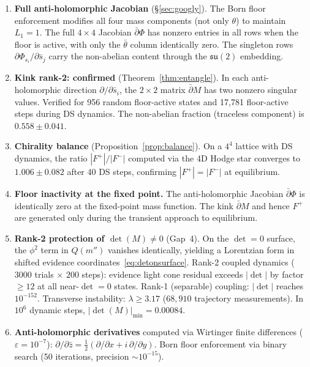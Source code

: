 \documentclass[11pt,a4paper]{article}
\theoremstyle{definition}
\theoremstyle{remark}
\newcommand{\dbar}{\bar{\partial}}
\newcommand{\su}{\mathfrak{su}}
\begin{document}
\begin{enumerate}[nosep]
\item \textbf{Full anti-holomorphic Jacobian} (\S\ref{sec:googly}). The Born floor enforcement modifies all four mass components (not only $\theta$) to maintain $L_1=1$. The full $4\times 4$ Jacobian $\dbar\Phi$ has nonzero entries in all rows when the floor is active, with only the $\bar{\theta}$ column identically zero. The singleton rows $\partial\Phi_{s_i}/\partial\bar{s}_j$ carry the non-abelian content through the $\su(2)$ embedding.

\item \textbf{Kink rank-2: confirmed} (Theorem~\ref{thm:entangle}). In each anti-holomorphic direction $\partial/\partial\bar{s}_i$, the $2\times 2$ matrix $\dbar M$ has two nonzero singular values. Verified for 956 random floor-active states and 17,781 floor-active steps during DS dynamics. The non-abelian fraction (traceless component) is $0.558\pm 0.041$.

\item \textbf{Chirality balance} (Proposition~\ref{prop:balance}). On a $4^4$ lattice with DS dynamics, the ratio $|F^+|/|F^-|$ computed via the 4D Hodge star converges to $1.006\pm 0.082$ after 40 DS steps, confirming $|F^+|=|F^-|$ at equilibrium.

\item \textbf{Floor inactivity at the fixed point.} The anti-holomorphic Jacobian $\dbar\Phi$ is identically zero at the fixed-point mass function. The kink $\dbar M$ and hence $F^+$ are generated only during the transient approach to equilibrium.

\item \textbf{Rank-2 protection of $\det(M)\neq 0$} (Gap~4). On the $\det=0$ surface, the $\phi^2$ term in $Q(m'')$ vanishes identically, yielding a Lorentzian form in shifted evidence coordinates~\eqref{eq:detonsurface}. Rank-2 coupled dynamics ($3000$ trials $\times$ $200$ steps): evidence light cone residual exceeds $|\det|$ by factor $\geq 12$ at all near-$\det=0$ states. Rank-1 (separable) coupling: $|\det|$ reaches $10^{-152}$. Transverse instability: $\lambda\geq 3.17$ ($68{,}910$ trajectory measurements). In $10^6$ dynamic steps, $|\det(M)|_{\min}=0.00084$.

\item \textbf{Anti-holomorphic derivatives} computed via Wirtinger finite differences ($\varepsilon=10^{-7}$): $\partial/\partial\bar{z}=\frac{1}{2}(\partial/\partial x+i\,\partial/\partial y)$. Born floor enforcement via binary search (50 iterations, precision $\sim 10^{-15}$).


\end{enumerate}
\end{document}
